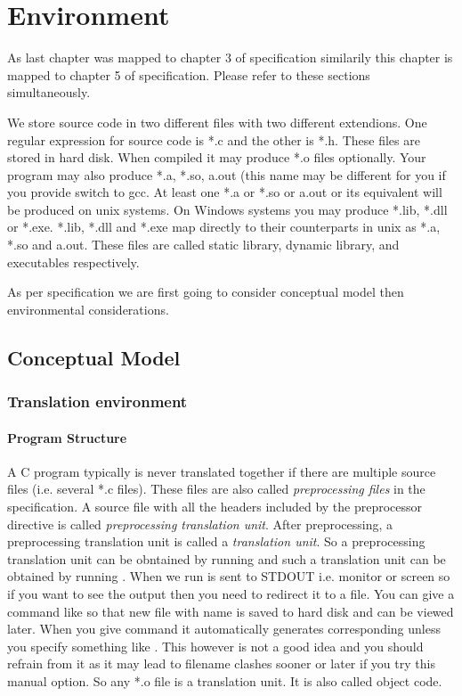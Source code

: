 \chapter{Environment}
\startcolumns[n=3,distance=2em]
  \placelist
    [section]
    [alternative=c, %
     interaction=all,]
\stopcolumns
As last chapter was mapped to chapter 3 of specification similarily
this chapter is mapped to chapter 5 of specification. Please refer to
these sections simultaneously.

We store source code in two different files with two different
extendions. One regular expression for source code is *.c and the
other is *.h. These files are stored in hard disk. When compiled it
may produce *.o files optionally. Your program may also produce *.a,
*.so, a.out (this name may be different for you if you provide
 switch to gcc. At least one *.a or *.so or a.out or its
equivalent will be produced on unix systems. On Windows systems you
may produce *.lib, *.dll or *.exe. *.lib, *.dll and *.exe map directly
to their counterparts in unix as *.a, *.so and a.out. These files are
called static library, dynamic library, and executables respectively.

As per specification we are first going to consider conceptual model
then environmental considerations.

\section{Conceptual Model}
\subsection{Translation environment}
\subsubsection{Program Structure}
A C program typically is never translated together if there are
multiple source files (i.e. several *.c files). These files are also
called {\it preprocessing files} in the specification. A source file
with all the headers included by the preprocessor directive
 is called {\it preprocessing translation unit}. After
preprocessing, a preprocessing translation unit is called a {\it
  translation unit}. So a preprocessing translation unit can be
obntained by running  and such a translation
unit can be obtained by running . When we run
 is sent to STDOUT i.e. monitor or screen so
if you want to see the output then you need to redirect it to a
file. You can give a command like  so that new file with name
 is saved to hard disk and can be viewed
later. When you give command  it automatically
generates corresponding  unless you specify something
like . This however is
not a good idea and you should refrain from it as it may lead to
filename clashes sooner or later if you try this manual option. So any
*.o file is a translation unit. It is also called object code.
